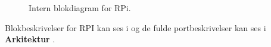 \documentclass[Rapport/Rapport_main.tex]{subfiles}
\begin{document}
\begin{figure}[H]
    \centering
    \caption{Intern blokdiagram for RPi.}
    \label{fig:rap_rpi_hardware_ibd}
\end{figure}
Blokbeskrivelser for RPI kan ses i  og de fulde portbeskrivelser kan ses i \textbf{Arkitektur} . 
\end{document}
